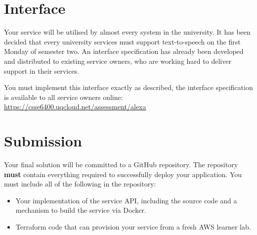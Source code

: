 \documentclass{csse4400}
\begin{document}


\section{Interface}
Your service will be utilised by almost every system in the university.
It has been decided that every university services must support text-to-speech on the first Monday of semester two.
An interface specification has already been developed and distributed to existing service owners,
who are working hard to deliver support in their services.

You must implement this interface exactly as described,
the interface specification is available to all service owners online:
\url{https://csse6400.uqcloud.net/assessment/alexa}

\section{Submission}
Your final solution will be committed to a GitHub repository.
The repository \textbf{must} contain everything required to successfully deploy your application.
You must include all of the following in the repository:
\begin{itemize}
  \item Your implementation of the service API, including the source code and a mechanism to build the service via Docker.
  \item Terraform code that can provision your service from a fresh AWS learner lab.
\end{itemize}

\end{document}
